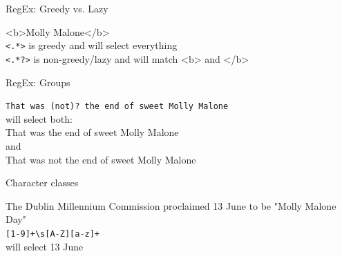 \documentclass[handout]{beamer}
\begin{document}
\begin{frame}[fragile]{RegEx: Greedy vs. Lazy}
	
	<b>Molly Malone</b> \\
	\lstinline{<.*>} is greedy and will select everything   \\
	\lstinline{<.*?>} is non-greedy/lazy and will match <b> and </b>

	
	
	
\end{frame}


\begin{frame}[fragile]{RegEx: Groups}
	
	\lstinline{That was (not)? the end of sweet Molly Malone} \\ 
	will select both:   \\
	That was the end of sweet Molly Malone \\
	and \\
	That was not the end of sweet Molly Malone
		
	
\end{frame}


\begin{frame}[fragile]{Character classes}
	
	
	The Dublin Millennium Commission proclaimed 13 June to be "Molly Malone Day" \\
	\lstinline{[1-9]+\s[A-Z][a-z]+} \\ 
	will select 13 June

	
	

\end{frame}
\end{document}
